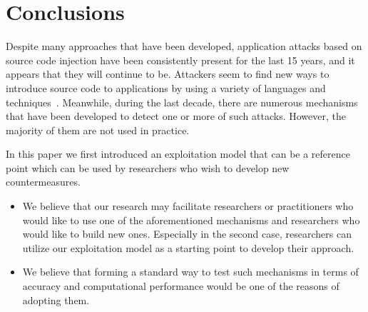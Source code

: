 \documentclass[conference]{IEEEtran}
\begin{document}

\section{Conclusions}
\label{sec:conclusion}

Despite many approaches that have been developed,
application attacks based on source code injection
have been consistently present for the last 15 years,
and it appears that they will continue to be.
Attackers seem to find new ways to introduce
source code to applications by using a variety of
languages and techniques~\cite{HNSHS12,DKH14}.
Meanwhile, during the last decade, there are
numerous mechanisms that have been developed to
detect one or more of such attacks. However,
the majority of them are not used in practice.

In this paper we first introduced an exploitation model
that can be a reference point which can be used by
researchers who wish to develop new countermeasures.


\begin{itemize}
\item We believe that our research may facilitate researchers
or practitioners who would like to use one of the
aforementioned mechanisms and researchers who would like
to build new ones. Especially in the second case,
researchers can utilize our exploitation model as a
starting point to develop their approach.
\item We believe that forming a
standard way to test such mechanisms in terms
of accuracy and computational performance
would be one of the reasons of adopting them.
\end{itemize}



\end{document}
